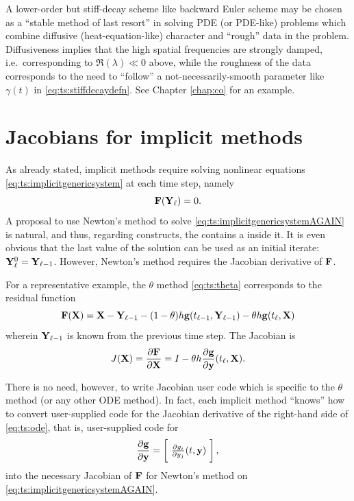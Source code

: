 A lower-order but stiff-decay scheme like backward Euler scheme may be chosen as a ``stable method of last resort'' in solving PDE (or PDE-like) problems which combine diffusive (heat-equation-like) character and ``rough'' data in the problem.  Diffusiveness implies that the high spatial frequencies are strongly damped, i.e.~corresponding to $\Re(\lambda)\ll 0$ above, while the roughness of the data corresponds to the need to ``follow'' a not-necessarily-smooth parameter like $\gamma(t)$ in \eqref{eq:ts:stiffdecaydefn}.  See Chapter \ref{chap:co} for an example.



\section{Jacobians for implicit methods}

As already stated, implicit methods require solving nonlinear equations \eqref{eq:ts:implicitgenericsystem} at each time step, namely
\begin{equation}
  \mathbf{F}(\mathbf{Y}_\ell) = 0. \label{eq:ts:implicitgenericsystemAGAIN}
\end{equation}
A proposal to use Newton's method to solve \eqref{eq:ts:implicitgenericsystemAGAIN} is natural, and thus, regarding \PETSc constructs, the \pTS contains a \pSNES inside it.  It is even obvious that the last value of the solution can be used as an initial iterate: $\mathbf{Y}_\ell^0 = \mathbf{Y}_{\ell-1}$.  However, Newton's method requires the Jacobian derivative of $\mathbf{F}$.

For a representative example, the $\theta$ method \eqref{eq:ts:theta} corresponds to the residual function
\begin{equation}
  \mathbf{F}(\mathbf{X}) = \mathbf{X} - \mathbf{Y}_{\ell-1} - (1-\theta) h \mathbf{g}(t_{\ell-1},\mathbf{Y}_{\ell-1}) - \theta h \mathbf{g}(t_\ell,\mathbf{X})  \label{eq:ts:thetasystem}
\end{equation}
wherein $\mathbf{Y}_{\ell-1}$ is known from the previous time step.  The Jacobian is
   $$J(\mathbf{X}) = \frac{\partial \mathbf{F}}{\partial \mathbf{X}} = I - \theta h \frac{\partial \mathbf{g}}{\partial \mathbf{y}}(t_\ell,\mathbf{X}).$$

There is no need, however, to write Jacobian user code which is specific to the $\theta$ method (or any other ODE method).  In fact, each implicit \pTS method ``knows'' how to convert user-supplied code for the Jacobian derivative of the right-hand side of \eqref{eq:ts:ode}, that is, user-supplied code for
\begin{equation}
\frac{\partial \mathbf{g}}{\partial \mathbf{y}} = \begin{bmatrix}\phantom{\bigg|} \frac{\partial g_i}{\partial y_j}(t,\mathbf{y}) \phantom{\bigg|}\end{bmatrix}, \label{eq:ts:rhsjacobian}
\end{equation}
into the necessary Jacobian of $\mathbf{F}$ for Newton's method on \eqref{eq:ts:implicitgenericsystemAGAIN}.

